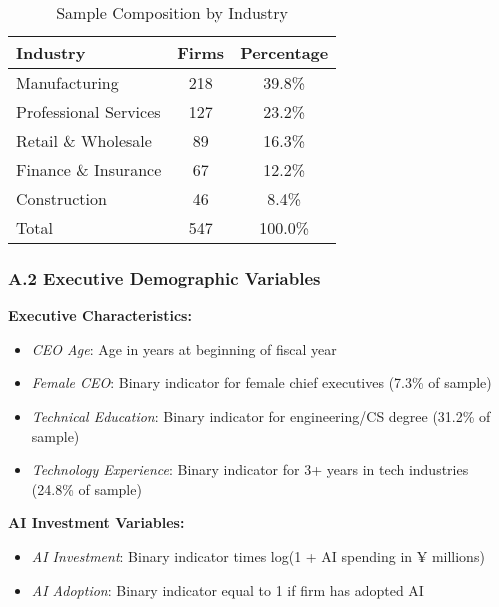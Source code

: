 \documentclass[12pt, a4paper]{article}
\begin{document}
\begin{table}[H]
\centering
\caption{Sample Composition by Industry}
\label{tab:sample_composition}
\begin{tabular}{lcc}
\toprule
Industry & Firms & Percentage \\
\midrule
Manufacturing & 218 & 39.8\% \\
Professional Services & 127 & 23.2\% \\
Retail \& Wholesale & 89 & 16.3\% \\
Finance \& Insurance & 67 & 12.2\% \\
Construction & 46 & 8.4\% \\
\midrule
Total & 547 & 100.0\% \\
\bottomrule
\end{tabular}
\end{table}

\subsubsection*{A.2 Executive Demographic Variables}

\textbf{Executive Characteristics:}
\begin{itemize}
\item \textit{CEO Age}: Age in years at beginning of fiscal year
\item \textit{Female CEO}: Binary indicator for female chief executives (7.3\% of sample)
\item \textit{Technical Education}: Binary indicator for engineering/CS degree (31.2\% of sample)
\item \textit{Technology Experience}: Binary indicator for 3+ years in tech industries (24.8\% of sample)
\end{itemize}

\textbf{AI Investment Variables:}
\begin{itemize}
\item \textit{AI Investment}: Binary indicator times log(1 + AI spending in ¥ millions)
\item \textit{AI Adoption}: Binary indicator equal to 1 if firm has adopted AI
\end{itemize}
\end{document}
